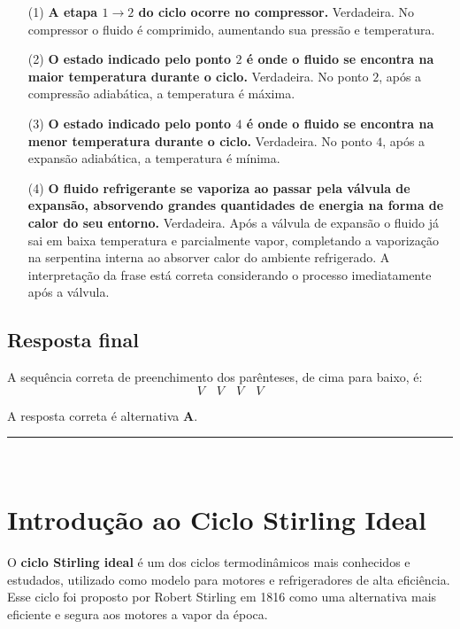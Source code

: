 \documentclass[a4paper,12pt]{article}
\begin{document}
\begin{flushleft}
\begin{itemize}
    \item[(1)] \textbf{A etapa \(1 \to 2\) do ciclo ocorre no compressor.}  
    Verdadeira. No compressor o fluido é comprimido, aumentando sua pressão e temperatura.  

    \item[(2)] \textbf{O estado indicado pelo ponto \(2\) é onde o fluido se encontra na maior temperatura durante o ciclo.}  
    Verdadeira. No ponto \(2\), após a compressão adiabática, a temperatura é máxima.  

    \item[(3)] \textbf{O estado indicado pelo ponto \(4\) é onde o fluido se encontra na menor temperatura durante o ciclo.}  
    Verdadeira. No ponto \(4\), após a expansão adiabática, a temperatura é mínima.  

    \item[(4)] \textbf{O fluido refrigerante se vaporiza ao passar pela válvula de expansão, absorvendo grandes quantidades de energia na forma de calor do seu entorno.}  
    Verdadeira. Após a válvula de expansão o fluido já sai em baixa temperatura e parcialmente vapor, completando a vaporização na serpentina interna ao absorver calor do ambiente refrigerado. A interpretação da frase está correta considerando o processo imediatamente após a válvula.
\end{itemize}

\subsection*{Resposta final}

A sequência correta de preenchimento dos parênteses, de cima para baixo, é:
\[
\boxed{V \quad V \quad V \quad V}
\]

A resposta correta é alternativa \colorbox{green!50}{\textbf{A}}.
\end{flushleft}

\noindent\rule{\linewidth}{0.6pt}\\

\section*{Introdução ao Ciclo Stirling Ideal}

O \colorbox{yellow!30}{\textbf{ciclo Stirling ideal} é um dos ciclos termodinâmicos mais conhecidos e estudados}, utilizado como modelo para motores e refrigeradores de alta eficiência. Esse ciclo foi proposto por Robert Stirling em 1816 como uma alternativa mais eficiente e segura aos motores a vapor da época.
\end{document}
